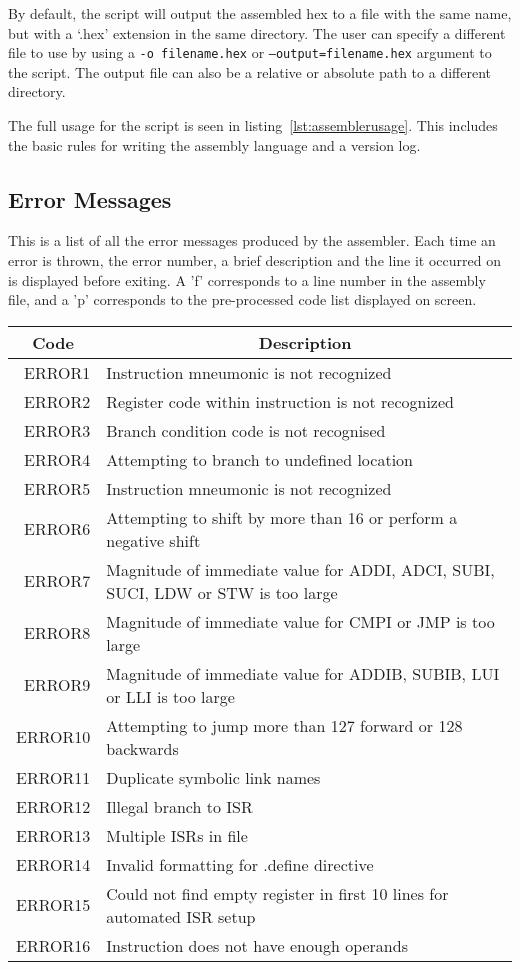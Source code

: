 By default, the script will output the assembled hex to a file with the same name, but with a `.hex' extension in the same directory.
The user can specify a different file to use by using a \texttt{-o filename.hex} or \texttt{--output=filename.hex} argument to the script.
The output file can also be a relative or absolute path to a different directory. 

The full usage for the script is seen in listing~\ref{lst:assemblerusage}. 
This includes the basic rules for writing the assembly language and a version log. 



\newpage
\subsection{Error Messages}
This is a list of all the error messages produced by the assembler. Each time an error is thrown, the error number, a brief description and the line it occurred on is displayed before exiting. A 'f' corresponds to a line number in the assembly file, and a 'p' corresponds to the pre-processed code list displayed on screen. 

\begin{center}
	\centering
	\begin{tabular}{r|p{12cm}}
		\multicolumn{1}{c}{\bf Code} & \multicolumn{1}{c}{\bf Description} \\
		\hline\hline
		ERROR1& Instruction mneumonic is not recognized \\
		ERROR2& Register code within instruction is not recognized\\
		ERROR3& Branch condition code is not recognised\\
		ERROR4& Attempting to branch to undefined location \\
		ERROR5& Instruction mneumonic is not recognized \\
		ERROR6& Attempting to shift by more than 16 or perform a negative shift \\
		ERROR7& Magnitude of immediate value for ADDI, ADCI, SUBI, SUCI, LDW or STW is too large\\
		ERROR8& Magnitude of immediate value for CMPI or JMP is too large \\
		ERROR9& Magnitude of immediate value for ADDIB, SUBIB, LUI or LLI is too large \\
		ERROR10& Attempting to jump more than 127 forward or 128 backwards \\
		ERROR11& Duplicate symbolic link names \\
		ERROR12& Illegal branch to ISR \\
		ERROR13& Multiple ISRs in file \\
		ERROR14& Invalid formatting for .define directive \\
		ERROR15& Could not find empty register in first 10 lines for automated ISR setup \\
		ERROR16& Instruction does not have enough operands \\
	\end{tabular}
\end{center}
